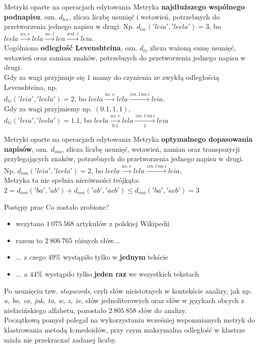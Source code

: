 \documentclass[11pt,pdftex,mathserif]{beamer}\usepackage[]{graphicx}\usepackage[]{color}
\theoremstyle{definition}
\begin{document}
\begin{frame}{Metryki oparte na operacjach edytowania}
Metryka \textbf{najdłuższego wspólnego podnapisu}, ozn. $d_{lcs}$, zlicza liczbę usunięć i wstawień, potrzebnych do przetworzenia jednego napisu w drugi. Np. $d_{lsc}('leia', 'leela') = 3$, bo $leela  \xrightarrow{us.\ e} lela  \xrightarrow{us.\ l} lea  \xrightarrow{wst.\ i} leia$.\\
\pause
Uogólniona \textbf{odległość Levenshteina}, ozn. $d_{lv}$ zlicza ważoną sumę usunięć, wstawień oraz zamian znaków, potrzebnych do przetworzenia jednego napisu w drugi. \\


\pause
Gdy za wagi przyjmuje się $1$ mamy do czynienia ze zwykłą odległością Levenshteina, np. \\
$d_{lv}('leia', 'leela') = 2$, bo $leela  \xrightarrow{us.\ e} lela  \xrightarrow{zm.\ l\ na\ i} leia$. \\
\pause
Gdy za wagi przyjmiemy np. $(0.1, 1, 1)$, \\
$d_{lv}('leia', 'leela') = 1.1$, bo $leela  \xrightarrow[0.1]{us.\ e} lela  \xrightarrow[1]{zm.\ l\ na\ i} leia$ 
\end{frame}



\begin{frame}{Metryki oparte na operacjach edytowania}
Metryka \textbf{optymalnego dopasowania napisów}, ozn. $d_{osa}$, zlicza liczbę usunięć, wstawień, zamian oraz transpozycji przylegających znaków, potrzebnych do przetworzenia jednego napisu w drugi. Np. $d_{osa}('leia', 'leela') = 2$, bo $leela  \xrightarrow{us.\ e} lela  \xrightarrow{zm.\ l\ na\ i} leia$. \\
\pause
Metryka ta nie spełnia nierówności trójkąta: $2 = d_{osa}('ba', 'ab') + d_{osa}('ab', 'acb') \leq d_{osa}('ba', 'acb') = 3$\\
\end{frame}

\begin{frame}{Postępy prac}
Co zostało zrobione?\\
\begin{itemize}
\item wczytano $1\ 075 \ 568$ artykułów z polskiej Wikipedii \pause
\item razem to $2\ 806\ 765$ różnych słów... \pause
\item ... z czego $49\%$ wystąpiło tylko w \textbf{jednym} tekście
\item ... a $44\%$ wystąpiło tylko \textbf{jeden raz} we wszystkich tekstach
\end{itemize}
\pause
Po usunięciu tzw. \emph{stopwords}, czyli słów nieistotnych w kontekście analizy, jak np. \emph{a, bo, co, jak, to, w, z, że}, słów jednoliterowych oraz słów w językach obcych z niełacińskiego alfabetu, pozostało $2\ 805\ 858$ słów do analizy.\\
\pause
Początkową pomysł polegał na wykorzystaniu wcześniej wspomnianych metryk do klastrowania metodą k-medoidów, przy czym maksymalna odległość w klastrze miała nie przekraczać zadanej liczby.
\end{frame}
\end{document}
